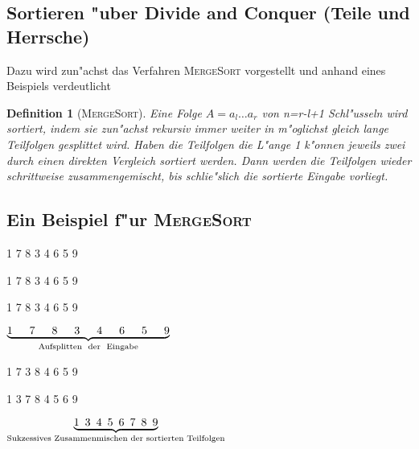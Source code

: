 \documentclass[draft,12pt]{scrreprt}
\theoremstyle{break}
\newtheorem{definition}{Definition}
\begin{document}
\subsection{Sortieren "uber Divide and Conquer (Teile und Herrsche)}
%
%
Dazu wird zun"achst das Verfahren \textsc{MergeSort} vorgestellt und anhand eines Beispiels verdeutlicht
\begin{definition}[\textsc{MergeSort}]
        Eine Folge $A=a_l\ldots a_r$ von n=r-l+1 Schl"usseln wird sortiert, indem sie zun"achst rekursiv immer weiter
	in m"oglichst gleich lange Teilfolgen gesplittet wird. Haben die Teilfolgen die L"ange 1 k"onnen jeweils zwei durch einen direkten
	Vergleich sortiert werden. Dann werden die Teilfolgen wieder schrittweise zusammengemischt, bis schlie"slich die sortierte Eingabe
	vorliegt. 
\end{definition}

\subsection{Ein Beispiel f"ur \textsc{MergeSort}}

\begin{center}
1 7 8 3 4 6 5 9
\medskip

1 7 8 3 \hspace{10pt} 4 6 5 9
\medskip

1 7 \hspace{10pt} 8 3 \hspace{10pt} 4 6 \hspace{10pt} 5 9
\medskip

$\underbrace{1 \hspace{15pt} 7 \hspace{15pt} 8 \hspace{15pt} 3 \hspace{15pt} 4 \hspace{15pt} 6 \hspace{15pt} 5 \hspace{15pt}
9}_{\textrm{\textup{Aufsplitten \ der \ Eingabe}}}$
\medskip

1 7 \hspace{10pt} 3 8 \hspace{10pt} 4 6 \hspace{10pt} 5 9
\medskip

1 3 7 8 \hspace{10pt} 4 5 6 9
\medskip

$\underbrace{1 \hspace{5pt} 3 \hspace{5pt} 4 \hspace{5pt} 5 \hspace{5pt} 6 \hspace{5pt} 7 \hspace{5pt} 8 \hspace{5pt}
9}_{\textrm{\textup{Sukzessives Zusammenmischen der sortierten Teilfolgen}}}$
\end{center}
\end{document}
